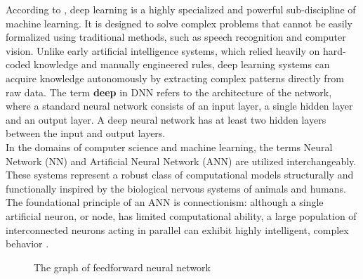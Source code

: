 According to \cite{Deep-Learning-book}, deep learning is a highly specialized and powerful sub-discipline of machine learning. It is designed to solve complex problems that cannot be easily formalized using traditional methods, such as speech recognition and computer vision. Unlike early artificial intelligence systems, which relied heavily on hard-coded knowledge and manually engineered rules, deep learning systems can acquire knowledge autonomously by extracting complex patterns directly from raw data. The term \textbf{deep} in DNN refers to the architecture of the network, where a standard neural network consists of an input layer, a single hidden layer and an output layer. A deep neural network has at least two hidden layers between the input and output layers.
\\In the domains of computer science and machine learning, the terms Neural Network (NN) and Artificial Neural Network (ANN) are utilized interchangeably. These systems represent a robust class of computational models structurally and functionally inspired by the biological nervous systems of animals and humans. The foundational principle of an ANN is connectionism: although a single artificial neuron, or node, has limited computational ability, a large population of interconnected neurons acting in parallel can exhibit highly intelligent, complex behavior \cite{Deep-Learning-book}. 
\begin{figure}[h]
	\centering
	\caption{The graph of feedforward neural network}
	\label{fig:FeedForwardNNGraph}
\end{figure}

